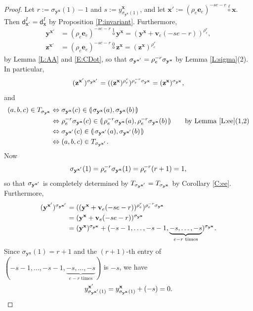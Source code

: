 \documentclass[11pt,a4paper,reqno]{amsart}
\numberwithin{equation}{section}
\theoremstyle{plain}
\theoremstyle{definition}
\theoremstyle{remark}
\numberwithin{equation}{section}
\newcommand{\bv}{\mathbf{v}}
\newcommand{\bx}{\mathbf{x}}
\newcommand{\by}{\mathbf{y}}
\newcommand{\bz}{\mathbf{z}}
\newcommand{\rr}{\rho}
\newcommand{\Be}{\mathbf{e}}
\newcommand{\CDot}[1]{\mathrel{\overset{#1}{\circ}}}
\newcommand{\dd}{\mathsf{d}}
\newcommand{\ft}[2]{\llparenthesis\, #1,#2 \,\rrparenthesis}
\begin{document}
\begin{proof}
Let $r := \sigma_{\by^{\bx}}(1) -1 $ and $s := y^{\bx}_{\sigma_{\by^{\bx}}(1)}$, and
let $\bx' := (\rr_e\Be_e)^{-s e - r} \CDot{\ell} \bx$.
Then $\dd_{\bx'}^I = \dd_{\bx}^I$ by Proposition \ref{P:invariant}.
Furthermore,
\begin{align*}
\by^{\bx'} &= (\rr_e\Be_e)^{-se-r} \CDot{1} \by^{\bx} = (\by^{\bx}+ \bv_e(-se-r))^{\rr_e^r}, \\
\bz^{\bx'} &= (\rr_e\Be_e)^{-se-r} \CDot{0} \bz^{\bx} = (\bz^{\bx})^{\rr_e^r}
\end{align*}
by Lemma \ref{L:AA} and \eqref{E:CDot},
so that
$\sigma_{\by^{\smash{\bx'}}} = \rr_e^{-r} \sigma_{\by^{\bx}}$ by Lemma \ref{L:sigma}(2).
In particular,
$$
(\bz^{\bx'})^{\sigma_{\by^{\bx\smash{'}}}} = ((\bz^{\bx})^{\rr_e^r})^{\rr_e^{-r} \sigma_{\by^{\bx}}} = (\bz^{\bx})^{\sigma_{\by^{\bx}}},
$$
and
\begin{align*}
(a,b,c) \in T_{\sigma_{\by^{\bx}}}
&\Leftrightarrow \sigma_{\by^{\bx}}(c) \in \ft{\sigma_{\by^{\bx}}(a)}{\sigma_{\by^{\bx}}(b)} \\
&\Leftrightarrow \rr_e^{-r}\sigma_{\by^{\bx}}(c) \in \ft{\rr_e^{-r}\sigma_{\by^{\bx}}(a)}{\rr_e^{-r}\sigma_{\by^{\bx}}(b)} \qquad \text{by Lemma \ref{L:ee}(1,2)} \\
&\Leftrightarrow \sigma_{\by^{\smash{\bx'}}}(c) \in \ft{\sigma_{\by^{\smash{\bx'}}}(a)}{\sigma_{\by^{\smash{\bx'}}}(b)} \\
&\Leftrightarrow (a,b,c) \in T_{\sigma_{\by^{\bx\smash{'}}}}.
\end{align*}
Now $$\sigma_{\by^{\bx\smash{'}}}(1) = \rr_e^{-r} \sigma_{\by^{\bx}}(1) = \rr_e^{-r}(r+1) = 1,$$ so that
$\sigma_{\by^{\bx\smash{'}}}$ is completely determined by $T_{\sigma_{\by^{\bx\smash{'}}}} = T_{\sigma_{\by^{\bx}}}$ by Corollary \ref{C:ee}.
Furthermore,
\begin{align*}
(\by^{\bx'})^{\sigma_{\by^{\bx\smash{'}}}}
&= ((\by^{\bx} + \bv_e(-se-r))^{\rr_e^r}) ^{\rr_e^{-r}\sigma_{\by^{\bx}}} \\
&= (\by^{\bx} + \bv_e(-se-r))^{\sigma_{\by^{\bx}}} \\
&= (\by^{\bx})^{\sigma_{\by^{\bx}}} + (-s-1,\dotsc, -s-1, \underbrace{-s,\dotsc, -s}_{e-r \text{ times}})^{\sigma_{\by^{\bx}}}.
\end{align*}
Since $\sigma_{\by^{\bx}}(1) = r+1$ and the $(r+1)$-th entry of $(-s-1,\dotsc, -s-1, \underbrace{-s,\dotsc, -s}_{e-r \text{ times}})$ is $-s$, we have
$$
y^{\bx'}_{\sigma_{\by^{\bx\smash{'}}}(1)} = y^{\bx}_{\sigma_{\by^{\bx}}(1)} + (-s) = 0.
$$

\end{proof}
\end{document}
